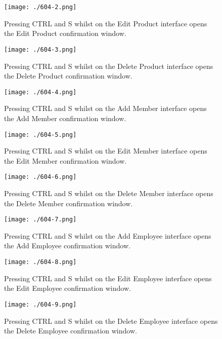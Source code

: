 \begin{figure}[H]
    \texttt{[image: ./604-2.png]}
    \caption{Pressing CTRL and S whilst on the Edit Product interface opens the Edit Product confirmation window.} \label{fig:604-2}
\end{figure}

\begin{figure}[H]
    \texttt{[image: ./604-3.png]}
    \caption{Pressing CTRL and S whilst on the Delete Product interface opens the Delete Product confirmation window.} \label{fig:604-3}
\end{figure}

\begin{figure}[H]
    \texttt{[image: ./604-4.png]}
    \caption{Pressing CTRL and S whilst on the Add Member interface opens the Add Member confirmation window.} \label{fig:604-4}
\end{figure}

\begin{figure}[H]
    \texttt{[image: ./604-5.png]}
    \caption{Pressing CTRL and S whilst on the Edit Member interface opens the Edit Member confirmation window.} \label{fig:604-5}
\end{figure}

\begin{figure}[H]
    \texttt{[image: ./604-6.png]}
    \caption{Pressing CTRL and S whilst on the Delete Member interface opens the Delete Member confirmation window.} \label{fig:604-6}
\end{figure}

\begin{figure}[H]
    \texttt{[image: ./604-7.png]}
    \caption{Pressing CTRL and S whilst on the Add Employee interface opens the Add Employee confirmation window.} \label{fig:604-7}
\end{figure}

\begin{figure}[H]
    \texttt{[image: ./604-8.png]}
    \caption{Pressing CTRL and S whilst on the Edit Employee interface opens the Edit Employee confirmation window.} \label{fig:604-8}
\end{figure}

\begin{figure}[H]
    \texttt{[image: ./604-9.png]}
    \caption{Pressing CTRL and S whilst on the Delete Employee interface opens the Delete Employee confirmation window.} \label{fig:604-9}
\end{figure}

